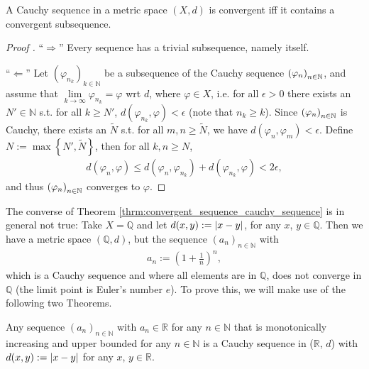 \begin{theorem}\label{thrm:cauchy_convergent_subsequence}
	A Cauchy sequence in a metric space $(X, d)$ is convergent iff it contains a convergent subsequence.
\end{theorem}

\begin{proof}[Proof \cite{354965}]
	\enquote{$\Longrightarrow$} Every sequence has a trivial subsequence, namely itself.
	
	\enquote{$\Longleftarrow$} Let $\left(\varphi_{n_k}\right)_{k\in\mathbb N}$ be a subsequence of the Cauchy sequence $\seq[\varphi_n]$, and assume that $\lim\limits_{k\to\infty}\varphi_{n_k} = \varphi$ wrt $d$, where $\varphi\in X$, i.e. for all $\epsilon > 0$ there exists an $N'\in\mathbb N$ s.t. for all $k\geq N'$, $d(\varphi_{n_k}, \varphi) < \epsilon$ (note that $n_k \geq k$). Since $\seq[\varphi_n]$ is Cauchy, there exists an $\tilde{N}$ s.t. for all $m, n\geq \tilde{N}$, we have $d(\varphi_n, \varphi_m) < \epsilon$. Define $N := \max\left\{N', \tilde{N}\right\}$, then for all $k, n\geq N$,
	\begin{align*}
		d(\varphi_n, \varphi) \leq d(\varphi_n, \varphi_{n_k}) + d(\varphi_{n_k}, \varphi) < 2\epsilon,
	\end{align*}
	and thus $\seq[\varphi_n]$ converges to $\varphi$.
\end{proof}

\begin{remark}\label{remark:cauchy_not_convergent_necess}
	The converse of Theorem \ref{thrm:convergent_sequence_cauchy_sequence} is in general not true: Take $X=\mathbb Q$ and let $d(x, y) := \abs{x - y}$, for any $x$, $y\in\mathbb Q$. Then we have a metric space $(\mathbb Q, d)$, but the sequence $(a_n)_{n\in\mathbb N}$ with
	\begin{align}\label{eq:seq_euler}
		a_n := \left(1 + \frac{1}{n}\right)^n,
	\end{align}
	which is a Cauchy sequence and where all elements are in $\mathbb Q$, does not converge in $\mathbb Q$ (the limit point is Euler's number $e$). To prove this, we will make use of the following two Theorems.
\end{remark}

\begin{theorem}\label{thrm:mono_inc_seq_Cauchy}
	Any sequence $(a_n)_{n\in\mathbb N}$ with $a_n\in \mathbb R$ for any $n\in \mathbb N$ that is monotonically increasing and upper bounded for any $n\in\mathbb N$ is a Cauchy sequence in ($\mathbb R$, $d$) with $d(x, y):= \abs{x - y}$ for any $x$, $y\in \mathbb R$.		
\end{theorem}

